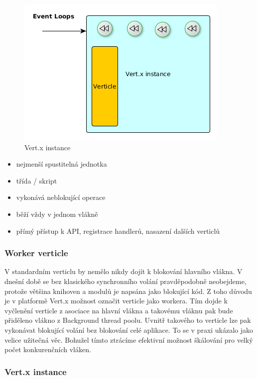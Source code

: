 \begin{figure}
\begin{centering}
\includegraphics[scale=0.5]{obrazky/instance}
\par\end{centering}
\caption{Vert.x instance \label{fig:instance}}
\end{figure}

\begin{itemize}
\item nejmenší spustitelná jednotka
\item třída / skript
\item vykonává neblokující operace
\item běží vždy v jednom vlákně
\item přímý přístup k API, registrace handlerů, nasazení dalších verticlů
\end{itemize}

\subsubsection{Worker verticle}

V standardním verticlu by nemělo nikdy dojít k blokování hlavního vlákna. V dnešní době se bez klasického synchronního volání pravděpodobně neobejdeme, protože většina knihoven a modulů je napsána jako blokující kód. Z toho důvodu je v platformě Vert.x možnost označit verticle jako workera. Tím dojde k vyčlenění verticle z asociace na hlavní vlákna a takovému vláknu pak bude přiděleno vlákno z Background thread poolu. Uvnitř takového to verticle lze pak vykonávat blokující volání bez blokování celé aplikace. To se v praxi ukázalo jako velice užitečná věc. Bohužel tímto ztrácíme efektivní možnost škálování pro velký počet konkurenčních vláken.

\subsubsection{Vert.x instance}

